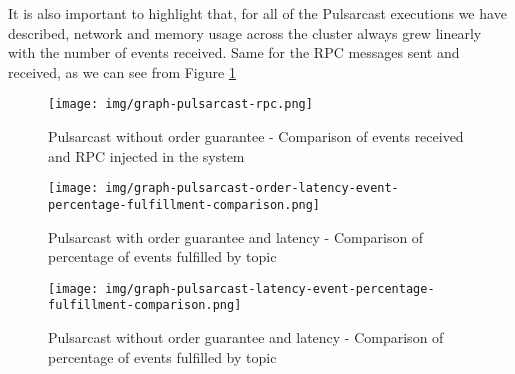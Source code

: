 It is also important to highlight that, for all of the Pulsarcast executions we
have described, network and memory usage across the cluster always grew
linearly with the number of events received. Same for the RPC messages sent and
received, as we can see from Figure \ref{fig:graph-pulsarcast-rpc}

\begin{figure}[!htb]
  \centering
  \texttt{[image: img/graph-pulsarcast-rpc.png]}
  \caption{Pulsarcast without order guarantee - Comparison of events received and RPC injected in the system}
  \label{fig:graph-pulsarcast-rpc}
\end{figure}

\begin{figure}[!htb]
  \centering
  \texttt{[image: img/graph-pulsarcast-order-latency-event-percentage-fulfillment-comparison.png]}
  \caption{Pulsarcast with order guarantee and latency - Comparison of percentage of events fulfilled by topic}
  \label{fig:graph-pulsarcast-order-latency-event-percentage-fulfillment-comparison}
\end{figure}

\begin{figure}[!htb]
  \centering
  \texttt{[image: img/graph-pulsarcast-latency-event-percentage-fulfillment-comparison.png]}
  \caption{Pulsarcast without order guarantee and latency - Comparison of percentage of events fulfilled by topic}
  \label{fig:graph-pulsarcast-latency-event-percentage-fulfillment-comparison}
\end{figure}
